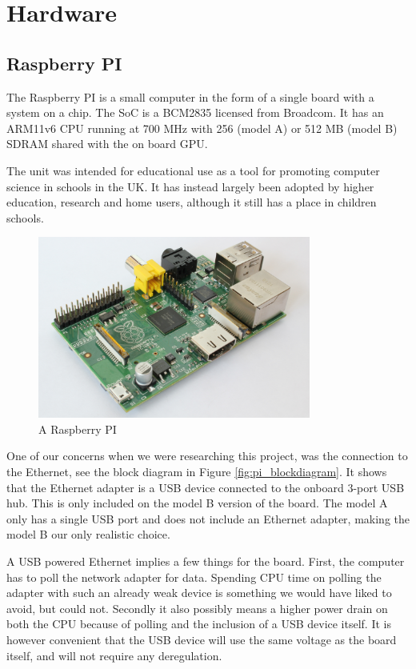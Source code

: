 \clearpage

\section{Hardware}
\label{sec:hardware}

\subsection{Raspberry PI}
The Raspberry PI is a small computer in the form of a single board with a system on a chip. The SoC is a BCM2835 licensed from Broadcom. It has an ARM11v6 CPU running at 700 MHz with 256 (model A) or 512 MB (model B) SDRAM shared with the on board GPU. 

The unit was intended for educational use as a tool for promoting computer science in schools in the UK. It has instead largely been adopted by higher education, research and home users, although it still has a place in children schools.

\begin{figure}[h]
    \centering
    \includegraphics[width=0.8\textwidth]{hardware/RaspberryPi}
    \caption{A Raspberry PI}
    \label{fig:raspberrypi_hw}
\end{figure}

One of our concerns when we were researching this project, was the connection to the Ethernet, see the block diagram in Figure \ref{fig:pi_blockdiagram}.
It shows that the Ethernet adapter is a USB device connected to the onboard 3-port USB hub. This is only included on the model B version of the board. 
The model A only has a single USB port and does not include an Ethernet adapter, making the model B our only realistic choice.

A USB powered Ethernet implies a few things for the board. First, the computer has to poll the network adapter for data. 
Spending CPU time on polling the adapter with such an already weak device is something we would have liked to avoid, but could not. Secondly it also possibly means a higher power drain on both the CPU because of polling and the inclusion of a USB device itself.
It is however convenient that the USB device will use the same voltage as the board itself, and will not require any deregulation. 

